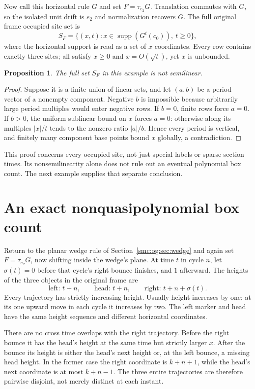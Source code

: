 \documentclass[11pt,letterpaper]{article}
\numberwithin{equation}{section}
\newtheorem{proposition}[theorem]{Proposition}
\theoremstyle{definition}
\theoremstyle{remark}
\newcommand{\supp}{\operatorname{supp}}
\begin{document}
Now call this horizontal rule $G$ and set $F=\tau_{e_2}G$. Translation commutes with $G$, so the isolated unit drift is $e_2$ and normalization recovers $G$. The full original frame occupied site set is
\[
 S_F=\{(x,t):x\in\supp(G^t(c_0)),\ t\ge0\},
\]
where the horizontal support is read as a set of $x$ coordinates. Every row contains exactly three sites; all satisfy $x\ge0$ and $x=O(\sqrt t)$, yet $x$ is unbounded.

\begin{proposition}\label{smc:og:prop:nonsemilinear}
The full set $S_F$ in this example is not semilinear.
\end{proposition}
\begin{proof}
Suppose it is a finite union of linear sets, and let $(a,b)$ be a period vector of a nonempty component. Negative $b$ is impossible because arbitrarily large period multiples would enter negative rows. If $b=0$, finite rows force $a=0$. If $b>0$, the uniform sublinear bound on $x$ forces $a=0$: otherwise along its multiples $|x|/t$ tends to the nonzero ratio $|a|/b$. Hence every period is vertical, and finitely many component base points bound $x$ globally, a contradiction.
\end{proof}
This proof concerns every occupied site, not just special labels or sparse section times. Its nonsemilinearity alone does not rule out an eventual polynomial box count. The next example supplies that separate conclusion.

\section{An exact nonquasipolynomial box count}\label{smc:og:sec:driftcount}
Return to the planar wedge rule of Section~\ref{smc:og:sec:wedge} and again set $F=\tau_{e_2}G$, now shifting inside the wedge's plane. At time $t$ in cycle $n$, let $\sigma(t)=0$ before that cycle's right bounce finishes, and $1$ afterward. The heights of the three objects in the original frame are
\[
 \text{left: }t+n,\qquad \text{head: }t+n,\qquad
 \text{right: }t+n+\sigma(t).
\]
Every trajectory has strictly increasing height. Usually height increases by one; at its one upward move in each cycle it increases by two. The left marker and head have the same height sequence and different horizontal coordinates.

There are no cross time overlaps with the right trajectory. Before the right bounce it has the head's height at the same time but strictly larger $x$. After the bounce its height is either the head's next height or, at the left bounce, a missing head height. In the former case the right coordinate is $k+n+1$, while the head's next coordinate is at most $k+n-1$. The three entire trajectories are therefore pairwise disjoint, not merely distinct at each instant.
\end{document}
